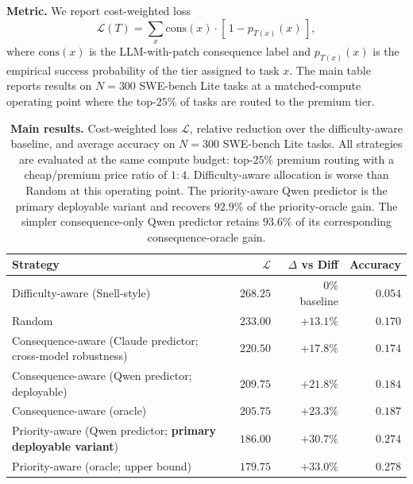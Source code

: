 \documentclass{article}
\begin{document}
\textbf{Metric.} We report cost-weighted loss
\[
\mathcal{L}(T) = \sum_x \mathrm{cons}(x)\cdot
[\,1 - p_{T(x)}(x)\,],
\]
where $\mathrm{cons}(x)$ is the LLM-with-patch consequence label and
$p_{T(x)}(x)$ is the empirical success probability of the tier assigned
to task $x$. The main table reports results on $N=300$ SWE-bench Lite
tasks at a matched-compute operating point where the top-$25\%$ of
tasks are routed to the premium tier.

\begin{table}[t]
\centering
\caption{\textbf{Main results.} Cost-weighted loss $\mathcal{L}$,
relative reduction over the difficulty-aware baseline, and average
accuracy on $N{=}300$ SWE-bench Lite tasks. All strategies are evaluated
at the same compute budget: top-$25\%$ premium routing with a
cheap/premium price ratio of $1{:}4$. Difficulty-aware allocation is
worse than Random at this operating point. The priority-aware Qwen
predictor is the primary deployable variant and recovers $92.9\%$ of
the priority-oracle gain. The simpler consequence-only Qwen predictor
retains $93.6\%$ of its corresponding consequence-oracle gain.}
\label{tab:main}
\small
\begin{tabular}{lrrr}
\toprule
Strategy & $\mathcal{L}$ & $\Delta$ vs Diff & Accuracy \\
\midrule
Difficulty-aware (Snell-style)~\citep{snell2024scaling}              & $268.25$ & ~~$0\%$ baseline & $0.054$ \\
Random                                                                & $233.00$ & $+13.1\%$ & $0.170$ \\
\midrule
Consequence-aware (Claude predictor; cross-model robustness)          & $220.50$ & $+17.8\%$ & $0.174$ \\
Consequence-aware (Qwen predictor; deployable)                        & $209.75$ & $+21.8\%$ & $0.184$ \\
Consequence-aware (oracle)                                            & $205.75$ & $+23.3\%$ & $0.187$ \\
\midrule
Priority-aware (Qwen predictor; \textbf{primary deployable variant})  & $\mathbf{186.00}$ & $\mathbf{+30.7\%}$ & $\mathbf{0.274}$ \\
Priority-aware (oracle; upper bound)                                  & $179.75$ & $+33.0\%$ & $0.278$ \\
\bottomrule
\end{tabular}
\end{table}
\end{document}

